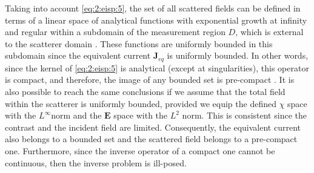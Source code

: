 			Taking into account \eqref{eq:2:eisp:5}, the set of all scattered fields can be defined in terms of a linear space of analytical functions with exponential growth at infinity and regular within a subdomain of the measurement region $D$, which is external to the scatterer domain \citep{bucci1989degrees}. These functions are uniformly bounded in this subdomain since the equivalent current $\mathbf{J}_{eq}$ is uniformly bounded. In other words, since the kernel of \eqref{eq:2:eisp:5} is analytical (except at singularities), this operator is compact, and therefore, the image of any bounded set is pre-compact \citep{bucci1989degrees}. It is also possible to reach the same conclusions if we assume that the total field within the scatterer is uniformly bounded, provided we equip the defined $\chi$ space with the $L^{\infty}$norm and the $\mathbf{E}$ space with the $L^2$ norm. This is consistent since the contrast and the incident field are limited. Consequently, the equivalent current also belongs to a bounded set and the scattered field belongs to a pre-compact one. Furthermore, since the inverse operator of a compact one cannot be continuous, then the inverse problem is ill-posed.
			
